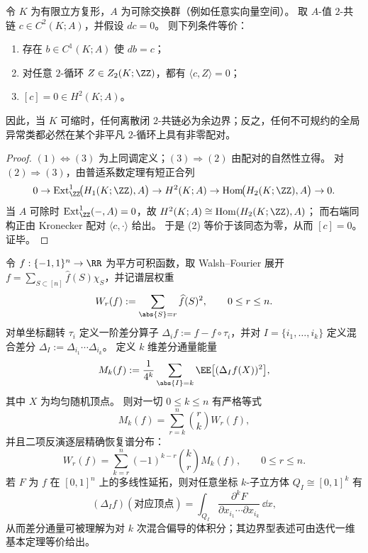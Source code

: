 \begin{proposition}\label{prop:discussion-cubical-stokes-elimination-2cycle}
令 \(K\) 为有限立方复形，\(A\) 为可除交换群（例如任意实向量空间）。
取 \(A\)-值 \(2\)-共链 \(c\in C^{2}(K;A)\)，并假设 \(dc=0\)。
则下列条件等价：
\begin{enumerate}
  \item 存在 \(b\in C^{1}(K;A)\) 使 \(db=c\)；
  \item 对任意 \(2\)-循环 \(Z\in Z_{2}(K;\ZZ)\)，都有 \(\langle c,Z\rangle=0\)；
  \item \([c]=0\in H^{2}(K;A)\)。
\end{enumerate}
因此，当 \(K\) 可缩时，任何离散闭 \(2\)-共链必为余边界；反之，任何不可规约的全局异常类都必然在某个非平凡 \(2\)-循环上具有非零配对。
\end{proposition}
\begin{proof}
\((1)\Leftrightarrow(3)\) 为上同调定义；\((3)\Rightarrow(2)\) 由配对的自然性立得。
对 \((2)\Rightarrow(3)\)，由普适系数定理有短正合列
\[
0\to \mathrm{Ext}^{1}_{\ZZ}\!\bigl(H_{1}(K;\ZZ),A\bigr)\to H^{2}(K;A)\to \mathrm{Hom}\!\bigl(H_{2}(K;\ZZ),A\bigr)\to 0.
\]
当 \(A\) 可除时 \(\mathrm{Ext}^{1}_{\ZZ}(-,A)=0\)，故 \(H^{2}(K;A)\cong \mathrm{Hom}(H_{2}(K;\ZZ),A)\)；
而右端同构正由 Kronecker 配对 \(\langle c,\cdot\rangle\) 给出。
于是 (2) 等价于该同态为零，从而 \([c]=0\)。证毕。
\end{proof}

\begin{theorem}\label{thm:discussion-hypercube-stokes-fourier-binomial}
令 \(f:\{-1,1\}^n\to\RR\) 为平方可积函数，取 Walsh--Fourier 展开 \(f=\sum_{S\subset[n]}\widehat f(S)\chi_S\)，并记谱层权重
\[
  W_r(f):=\sum_{\abs{S}=r}\widehat f(S)^2,\qquad 0\le r\le n.
\]
对单坐标翻转 \(\tau_i\) 定义一阶差分算子 \(\Delta_i f:=f-f\circ\tau_i\)，并对 \(I=\{i_1,\dots,i_k\}\) 定义混合差分 \(\Delta_I:=\Delta_{i_1}\cdots\Delta_{i_k}\)。
定义 \(k\) 维差分通量能量
\[
  M_k(f):=\frac1{4^k}\sum_{\abs{I}=k}\EE\bigl[(\Delta_I f(X))^2\bigr],
\]
其中 \(X\) 为均匀随机顶点。
则对一切 \(0\le k\le n\) 有严格等式
\[
  M_k(f)=\sum_{r=k}^n\binom{r}{k}W_r(f),
\]
并且二项反演逐层精确恢复谱分布：
\[
  W_r(f)=\sum_{k=r}^n(-1)^{k-r}\binom{k}{r}M_k(f),\qquad 0\le r\le n.
\]
若 \(F\) 为 \(f\) 在 \([0,1]^n\) 上的多线性延拓，则对任意坐标 \(k\)-子立方体 \(Q_I\cong[0,1]^k\) 有
\[
  (\Delta_I f)(\text{对应顶点})
  =
  \int_{Q_I}\frac{\partial^k F}{\partial x_{i_1}\cdots\partial x_{i_k}}\,\dd x,
\]
从而差分通量可被理解为对 \(k\) 次混合偏导的体积分；其边界型表述可由迭代一维基本定理等价给出。
\end{theorem}

